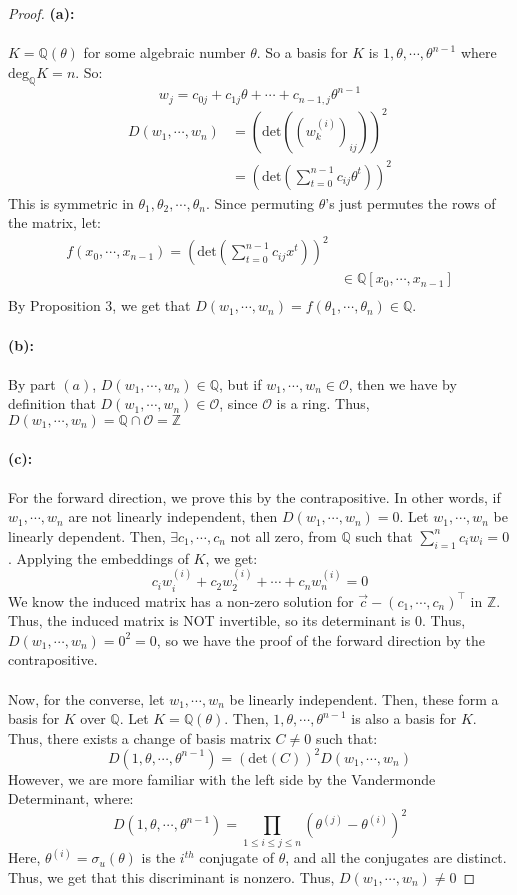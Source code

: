 \documentclass{article}
\newcommand{\Q}{\mathbb{Q}}
\newcommand{\Z}{\mathbb{Z}}
\begin{document}
\begin{proof}
\textbf{(a):}\\
\\
$K=\Q(\theta)$ for some algebraic number $\theta$. So a basis for $K$ is $1,\theta, \cdots ,\theta^{n-1}$ where $\text{deg}_\Q K=n$. So:
$$w_j=c_{0j}+c_{1j}\theta+ \cdots + c_{n-1,j}\theta^{n-1}$$
\begin{align*}
    D(w_1,\cdots ,w_n)&=(\text{det}((w_k^{(i)})_{ij}))^2\\
    &=(\text{det}\left(\sum_{t=0}^{n-1}c_{ij}\theta^t\right))^2
\end{align*}
This is symmetric in $\theta_1,\theta_2,\cdots ,\theta_n$. Since permuting $\theta$'s just permutes the rows of the matrix, let:
\begin{align*}
    f(x_0,\cdots ,x_{n-1})=(\text{det}\left(\sum_{t=0}^{n-1}c_{ij}x^t\right))^2\\
    &\in \Q[x_0,\cdots ,x_{n-1}]\\
\end{align*}
By Proposition 3, we get that $D(w_1,\cdots , w_n)=f(\theta_1,\cdots ,\theta_n)\in\Q$.\\
\\
\textbf{(b):}\\
\\
By part $(a)$, $D(w_1,\cdots , w_n)\in\Q$, but if $w_1,\cdots , w_n\in\mathcal{O}$, then we have by definition that $D(w_1,\cdots ,w_n)\in\mathcal{O}$, since $\mathcal{O}$ is a ring. Thus, $D(w_1,\cdots ,w_n)=\Q\cap \mathcal{O} = \Z$\\
\\
\textbf{(c):}\\
\\
For the forward direction, we prove this by the contrapositive. In other words, if $w_1,\cdots ,w_n$ are not linearly independent, then $D(w_1,\cdots ,w_n)=0$. Let $w_1,\cdots ,w_n$ be linearly dependent. Then, $\exists c_1,\cdots ,c_n$ not all zero, from $\Q$ such that $\displaystyle\sum_{i=1}^nc_iw_i=0$. Applying the embeddings of $K$, we get:
$$c_iw_i^{(i)}+c_2w_2^{(i)}+\cdots +c_nw_n^{(i)}=0$$
We know the induced matrix has a non-zero solution for $\vec{c}-(c_1,\cdots ,c_n)^\top$ in $\Z$. Thus, the induced matrix is NOT invertible, so its determinant is 0. Thus, $D(w_1,\cdots ,w_n)=0^2=0$, so we have the proof of the forward direction by the contrapositive.\\
\\
Now, for the converse, let $w_1,\cdots ,w_n$ be linearly independent. Then, these form a basis for $K$ over $\Q$. Let $K=\Q(\theta)$. Then, $1,\theta,\cdots, \theta^{n-1}$ is also a basis for $K$. Thus, there exists a change of basis matrix $C\neq 0$ such that:
$$D(1,\theta,\cdots, \theta^{n-1})=(\text{det}(C))^2D(w_1,\cdots, w_n)$$
However, we are more familiar with the left side by the Vandermonde Determinant, where:
$$D(1,\theta,\cdots, \theta^{n-1})=\displaystyle\prod_{1\leq i\leq j\leq n}(\theta^{(j)}-\theta^{(i)})^2$$
Here, $\theta^{(i)}=\sigma_u(\theta)$ is the $i^{th}$ conjugate of $\theta$, and all the conjugates are distinct. Thus, we get that this discriminant is nonzero. Thus, $D(w_1,\cdots, w_n)\neq 0$
\end{proof}
\newpage
\end{document}
